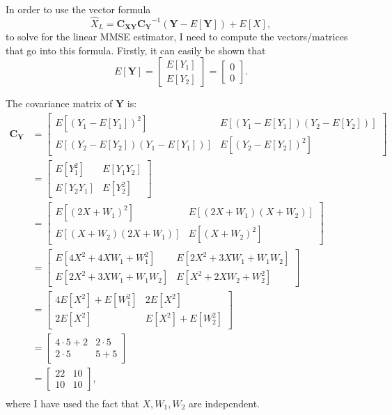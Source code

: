 \begin{problem}{9}  In order to use the vector formula
\begin{equation*}
\hat X_L =\bm{C_{XY}} \bm{C_Y}^{-1}(\bm Y - E[\bm Y])+E[X],
\end{equation*}
to solve for the linear MMSE estimator, I need to compute the vectors/matrices that go into this formula.  Firstly, it can easily be shown that 
\begin{equation*}
E[\bm Y] = \begin{bmatrix} E[Y_1] \\ E[Y_2] \end{bmatrix} = \begin{bmatrix} 0 \\ 0 \end{bmatrix}.
\end{equation*}

The covariance matrix of $\bm Y$ is:
\begin{align*}
\bm{C_Y}  &=  \left[\begin{matrix}
    E[(Y_1-E[Y_1])^2] & E[(Y_1-E[Y_1])(Y_2-E[Y_2])] \\
    E[(Y_2-E[Y_2])(Y_1-E[Y_1])] & E[(Y_2-E[Y_2])^2] 
\end{matrix}\right] \\
&=  \left[\begin{matrix}
    E[Y_1^2] & E[Y_1Y_2] \\
    E[Y_2Y_1] & E[Y_2^2] 
\end{matrix}\right] \\
&=  \left[\begin{matrix}
    E[(2X+W_1)^2] & E[(2X+W_1)(X+W_2)] \\
    E[(X+W_2)(2X+W_1)] & E[(X+W_2)^2] 
\end{matrix}\right] \\
&=  \left[\begin{matrix}
    E[4X^2+4XW_1+W_1^2] & E[2X^2+3XW_1+W_1W_2] \\
    E[2X^2+3XW_1+W_1W_2]& E[X^2+2XW_2+W_2^2] 
\end{matrix}\right] \\
&=  \left[\begin{matrix}
    4E[X^2]+E[W_1^2] & 2E[X^2] \\
    2E[X^2] & E[X^2]+E[W_2^2] 
\end{matrix}\right] \\
&=  \left[\begin{matrix}
    4\cdot 5+2 & 2\cdot 5 \\
    2\cdot5 & 5+5 
\end{matrix}\right] \\
&=  \left[\begin{matrix}
    22 & 10 \\
    10 & 10 
\end{matrix}\right], \\
\end{align*}
where I have used the fact that $X, W_1, W_2$ are independent.


\end{problem}
